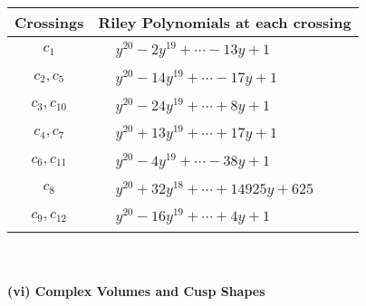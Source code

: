 \documentclass[1p]{elsarticle_modified}
\theoremstyle{definition}
\begin{document}
\begin{tabular}{m{50pt}|m{274pt}}
Crossings & \hspace{64pt}Riley Polynomials at each crossing \\
\hline $$\begin{aligned}c_{1}\end{aligned}$$&$\begin{aligned}
&y^{20}-2 y^{19}+\cdots-13 y+1
\end{aligned}$\\
\hline $$\begin{aligned}c_{2},c_{5}\end{aligned}$$&$\begin{aligned}
&y^{20}-14 y^{19}+\cdots-17 y+1
\end{aligned}$\\
\hline $$\begin{aligned}c_{3},c_{10}\end{aligned}$$&$\begin{aligned}
&y^{20}-24 y^{19}+\cdots+8 y+1
\end{aligned}$\\
\hline $$\begin{aligned}c_{4},c_{7}\end{aligned}$$&$\begin{aligned}
&y^{20}+13 y^{19}+\cdots+17 y+1
\end{aligned}$\\
\hline $$\begin{aligned}c_{6},c_{11}\end{aligned}$$&$\begin{aligned}
&y^{20}-4 y^{19}+\cdots-38 y+1
\end{aligned}$\\
\hline $$\begin{aligned}c_{8}\end{aligned}$$&$\begin{aligned}
&y^{20}+32 y^{18}+\cdots+14925 y+625
\end{aligned}$\\
\hline $$\begin{aligned}c_{9},c_{12}\end{aligned}$$&$\begin{aligned}
&y^{20}-16 y^{19}+\cdots+4 y+1
\end{aligned}$\\
\hline
\end{tabular}\\~\\
\newpage\flushleft \textbf{(vi) Complex Volumes and Cusp Shapes}
\end{document}
